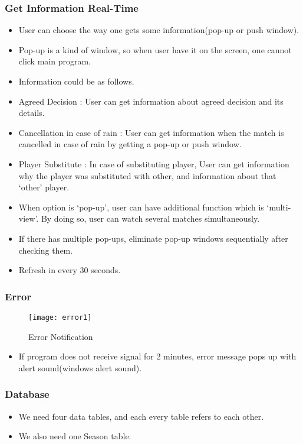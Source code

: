 \documentclass[conference,compsoc, twocolumn]{IEEEtran}
\begin{document}
\subsubsection{Get Information Real-Time}
\begin{itemize}
\item User can choose the way one gets some information(pop-up or push window).
\item Pop-up is a kind of window, so when user have it on the screen, one cannot click main program.
\item Information could be as follows.
\item Agreed Decision : User can get information about agreed decision and its details.
\item Cancellation in case of rain : User can get information when the match is cancelled in case of rain by getting a pop-up or push window.
\item Player Substitute : In case of substituting player, User can get information why the player was substituted with other, and information about that ‘other’  player.
\item When option is ‘pop-up’, user can have additional function which is ‘multi-view’.  By doing so, user can watch several matches simultaneously.
\item If there has multiple pop-ups, eliminate pop-up windows sequentially after checking them.
\item Refresh in every 30 seconds.
\end{itemize}



\subsubsection{Error}
\begin{figure}[h]
\centering\texttt{[image: error1]}
\caption{Error Notification}
\end{figure}

\begin{itemize}
\item  If program does not receive signal for 2 minutes, error message pops up with alert sound(windows alert sound).
\end{itemize}

\subsubsection{Database}
\begin{itemize}
\item We need four data tables, and each every table refers to each other.
\item We also need one Season table.
\end{itemize}
\end{document}
